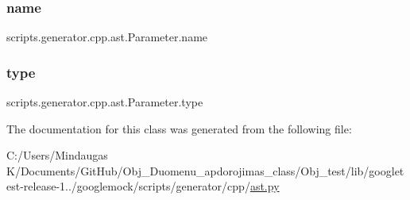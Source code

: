 \subsubsection{\texorpdfstring{name}{name}}
{\footnotesize\ttfamily scripts.\+generator.\+cpp.\+ast.\+Parameter.\+name}

\mbox{\label{classscripts_1_1generator_1_1cpp_1_1ast_1_1_parameter_af16a26ffc686971c30bcf4cbe2624347}} 
\subsubsection{\texorpdfstring{type}{type}}
{\footnotesize\ttfamily scripts.\+generator.\+cpp.\+ast.\+Parameter.\+type}



The documentation for this class was generated from the following file\+:\begin{DoxyCompactItemize}
\item 
C\+:/\+Users/\+Mindaugas K/\+Documents/\+Git\+Hub/\+Obj\+\_\+\+Duomenu\+\_\+apdorojimas\+\_\+class/\+Obj\+\_\+test/lib/googletest-\/release-\/1../googlemock/scripts/generator/cpp/\mbox{\hyperlink{_obj__test_2lib_2googletest-release-1_88_81_2googlemock_2scripts_2generator_2cpp_2ast_8py}{ast.\+py}}\end{DoxyCompactItemize}
